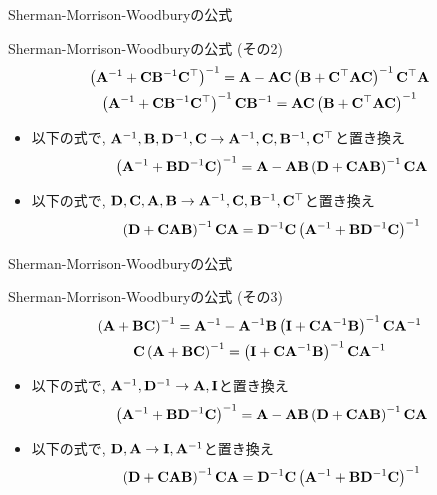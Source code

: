 \documentclass[dvipdfmx,notheorems,t]{beamer}
\begin{document}
\begin{frame}{Sherman-Morrison-Woodburyの公式}
\begin{block}{Sherman-Morrison-Woodburyの公式 (その2)}
  \begin{gather*}
    \left( \vb{A}^{-1} + \vb{C} \vb{B}^{-1} \vb{C}^\top \right)^{-1}
      = \vb{A} - \vb{A} \vb{C}
        \left( \vb{B} + \vb{C}^\top \vb{A} \vb{C} \right)^{-1} \vb{C}^\top \vb{A} \\
    \left( \vb{A}^{-1} + \vb{C} \vb{B}^{-1} \vb{C}^\top \right)^{-1} \vb{C} \vb{B}^{-1}
      = \vb{A} \vb{C} \left( \vb{B} + \vb{C}^\top \vb{A} \vb{C} \right)^{-1}
  \end{gather*}
\end{block}
\begin{itemize}
  \item 以下の式で, $\vb{A}^{-1}, \vb{B}, \vb{D}^{-1}, \vb{C} \to \vb{A}^{-1}, \vb{C}, \vb{B}^{-1}, \vb{C}^\top$と置き換え
  $$\left( \vb{A}^{-1} + \vb{B} \vb{D}^{-1} \vb{C} \right)^{-1}
    = \vb{A} - \vb{A} \vb{B}
      \left( \vb{D} + \vb{C} \vb{A} \vb{B} \right)^{-1} \vb{C} \vb{A}$$
  \item 以下の式で, $\vb{D}, \vb{C}, \vb{A}, \vb{B} \to \vb{A}^{-1}, \vb{C}, \vb{B}^{-1}, \vb{C}^\top$と置き換え
  $$\left( \vb{D} + \vb{C} \vb{A} \vb{B} \right)^{-1} \vb{C} \vb{A}
    = \vb{D}^{-1} \vb{C} \left( \vb{A}^{-1} + \vb{B} \vb{D}^{-1} \vb{C} \right)^{-1}$$
\end{itemize}
\end{frame}

\begin{frame}{Sherman-Morrison-Woodburyの公式}
\begin{block}{Sherman-Morrison-Woodburyの公式 (その3)}
  \begin{gather*}
    \left( \vb{A} + \vb{B} \vb{C} \right)^{-1}
      = \vb{A}^{-1} - \vb{A}^{-1} \vb{B}
        \left( \vb{I} + \vb{C} \vb{A}^{-1} \vb{B} \right)^{-1} \vb{C} \vb{A}^{-1} \\
    \vb{C} \left( \vb{A} + \vb{B} \vb{C} \right)^{-1}
      = \left( \vb{I} + \vb{C} \vb{A}^{-1} \vb{B} \right)^{-1} \vb{C} \vb{A}^{-1}
  \end{gather*}
\end{block}

\begin{itemize}
  \item 以下の式で, $\vb{A}^{-1}, \vb{D}^{-1} \to \vb{A}, \vb{I}$と置き換え
  $$\left( \vb{A}^{-1} + \vb{B} \vb{D}^{-1} \vb{C} \right)^{-1}
    = \vb{A} - \vb{A} \vb{B}
      \left( \vb{D} + \vb{C} \vb{A} \vb{B} \right)^{-1} \vb{C} \vb{A}$$
  \item 以下の式で, $\vb{D}, \vb{A} \to \vb{I}, \vb{A}^{-1}$と置き換え
  $$\left( \vb{D} + \vb{C} \vb{A} \vb{B} \right)^{-1} \vb{C} \vb{A}
    = \vb{D}^{-1} \vb{C} \left( \vb{A}^{-1} + \vb{B} \vb{D}^{-1} \vb{C} \right)^{-1}$$
\end{itemize}
\end{frame}
\end{document}
